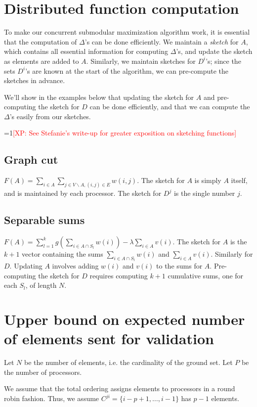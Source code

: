 \documentclass{article} %
\newcommand{\Comments}{1}
\newcommand{\note}[2]{\ifnum\Comments=1\textcolor{#1}{#2}\fi}
\newcommand{\xinghao}[1]{\note{red}{[XP: #1]}}
\begin{document}
\section{Distributed function computation}
To make our concurrent submodular maximization algorithm work, it is essential that the computation of $\Delta$'s can be done efficiently.
We maintain a \textit{sketch} for $A$, which contains all essential information for computing $\Delta$'s, and update the sketch as elements are added to $A$.
Similarly, we maintain sketches for $D^i$'s; since the sets $D^i$'s are known at the start of the algorithm, we can pre-compute the sketches in advance.

We'll show in the examples below that updating the sketch for $A$ and pre-computing the sketch for $D$ can be done efficiently, and that we can compute the $\Delta$'s easily from our sketches.

\xinghao{See Stefanie's write-up for greater exposition on sketching functions}

\subsection{Graph cut}
$F(A) = \sum_{i\in A}\sum_{j\in V\backslash A, (i,j)\in E} w(i,j)$.
The sketch for $A$ is simply $A$ itself, and is maintained by each processor.
The sketch for $D^j$ is the single number $j$.

\subsection{Separable sums}

$F(A) = \sum_{l=1}^k g\left(\sum_{i\in A\cap S_l}w(i)\right) - \lambda\sum_{i\in A}v(i)$.
The sketch for $A$ is the $k+1$ vector containing the sums $\sum_{i\in A\cap S_l}w(i)$ and $\sum_{i\in A}v(i)$.
Similarly for $D$.
Updating $A$ involves adding $w(i)$ and $v(i)$ to the sums for $A$.
Pre-computing the sketch for $D$ requires computing $k+1$ cumulative sums, one for each $S_l$, of length $N$.


\section{Upper bound on expected number of elements sent for validation}
Let $N$ be the number of elements, i.e. the cardinality of the ground set.
Let $P$ be the number of processors.

We assume that the total ordering assigns elements to processors in a round robin fashion.
Thus, we assume $C^{ji}=\{i-p+1,\dots,i-1\}$ has $p-1$ elements.
\end{document}
